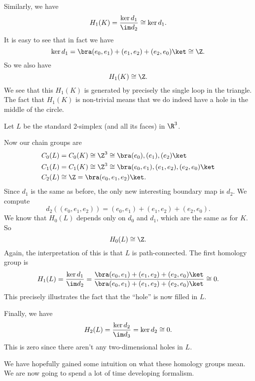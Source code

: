 \documentclass[a4paper]{article}
\begin{document}
\begin{eg}
  Similarly, we have
  \[
    H_1(K) = \frac{\ker d_1}{\im d_2} \cong \ker d_1.
  \]
  It is easy to see that in fact we have
  \[
    \ker d_1 = \bra (e_0, e_1) + (e_1, e_2) + (e_2, e_0)\ket \cong \Z.
  \]
  So we also have
  \[
    H_1(K) \cong \Z.
  \]
  We see that this $H_1(K)$ is generated by precisely the single loop in the triangle. The fact that $H_1(K)$ is non-trivial means that we do indeed have a hole in the middle of the circle.
\end{eg}

\begin{eg}
  Let $L$ be the standard $2$-simplex (and all its faces) in $\R^3$.
   \begin{center}
  \end{center}
  Now our chain groups are
  \begin{align*}
    C_0(L) &= C_0(K) \cong \Z^3 \cong \bra (e_0), (e_1), (e_2)\ket\\
    C_1(L) &= C_1(K) \cong \Z^3 \cong \bra (e_0, e_1), (e_1, e_2), (e_2, e_0)\ket\\
    C_2(L) &\cong \Z = \bra (e_0, e_1, e_2)\ket.
  \end{align*}
  Since $d_1$ is the same as before, the only new interesting boundary map is $d_2$. We compute
  \[
    d_2 ((e_0, e_1, e_2)) = (e_0, e_1) + (e_1, e_2) + (e_2, e_0).
  \]
  We know that $H_0(L)$ depends only on $d_0$ and $d_1$, which are the same as for $K$. So
  \[
    H_0(L) \cong \Z.
  \]
  Again, the interpretation of this is that $L$ is path-connected. The first homology group is
  \[
    H_1(L) = \frac{\ker d_1}{\im d_2} = \frac{\bra (e_0, e_1) + (e_1, e_2) + (e_2, e_0) \ket}{\bra (e_0, e_1) + (e_1, e_2) + (e_2, e_0) \ket} \cong 0.
  \]
  This precisely illustrates the fact that the ``hole'' is now filled in $L$.

  Finally, we have
  \[
    H_2(L) = \frac{\ker d_2}{\im d_3} = \ker d_2 \cong 0.
  \]
  This is zero since there aren't any two-dimensional holes in $L$.
\end{eg}
We have hopefully gained some intuition on what these homology groups mean. We are now going to spend a lot of time developing formalism.
\end{document}
